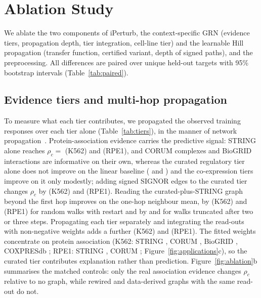\section{Ablation Study}
\label{sec:ablation}
We ablate the two components of iPerturb, the context-specific GRN (evidence tiers, propagation depth, tier integration, cell-line tier) and the learnable Hill propagation (transfer function, certified variant, depth of signed paths), and the preprocessing.
All differences are paired over unique held-out targets with 95\% bootstrap intervals (Table~\ref{tab:paired}).

\begin{table}[!t]
\centering
\caption{\textbf{Paired differences in $\rho_c$ between iPerturb read-outs and controls.} Mean difference with 95\% bootstrap interval over unique held-out targets.}
\label{tab:paired}
\scriptsize

\end{table}

\subsection{Evidence tiers and multi-hop propagation}
\label{sec:ablation_tiers}
\label{sec:ablation_layers}
To measure what each tier contributes, we propagated the observed training responses over each tier alone (Table~\ref{tab:tiers}), in the manner of network propagation~\cite{cowen2017network}.
Protein-association evidence carries the predictive signal: STRING alone reaches $\rho_c=$  (K562) and  (RPE1), and CORUM complexes and BioGRID interactions are informative on their own, whereas the curated regulatory tier alone does not improve on the linear baseline ( and ) and the co-expression tiers improve on it only modestly; adding signed SIGNOR edges to the curated tier changes $\rho_c$ by  (K562) and  (RPE1).
Reading the curated-plus-STRING graph beyond the first hop improves on the one-hop neighbour mean, by  (K562) and  (RPE1) for random walks with restart and by  and  for walks truncated after two or three steps.
Propagating each tier separately and integrating the read-outs with non-negative weights adds a further  (K562) and  (RPE1).
The fitted weights concentrate on protein association (K562: STRING , CORUM , BioGRID , COXPRESdb ; RPE1: STRING , CORUM ; Figure~\ref{fig:applications}c), so the curated tier contributes explanation rather than prediction.
Figure~\ref{fig:ablation}b summarises the matched controls: only the real association evidence changes $\rho_c$ relative to no graph, while rewired and data-derived graphs with the same read-out do not.

